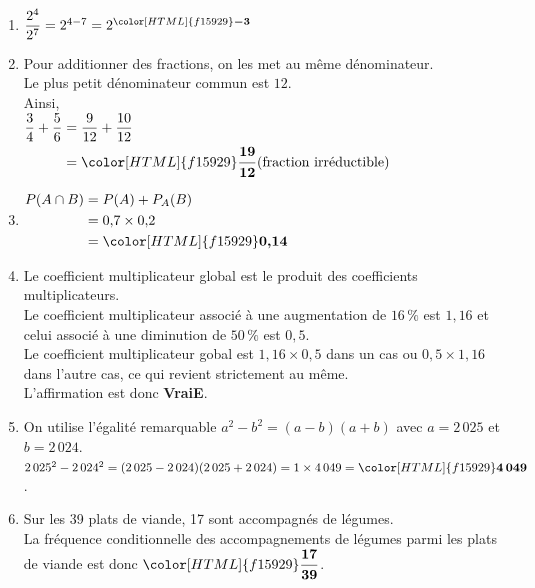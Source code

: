 \documentclass[a4paper,11pt,landscape,exos]{nsi} %
\begin{document}
\begin{multicols}{2}
\begin{enumerate}[]
\item $\dfrac{2^4}{2^7}=2^{4-7}=2^{\color[HTML]{f15929}\boldsymbol{-3}}$

\item Pour additionner des fractions, on les met au même dénominateur.\\
  Le plus petit dénominateur commun est $12$.\\
             Ainsi, \\
           $\begin{aligned}
           \dfrac{3}{4} + \dfrac{5}{6}&=
            \dfrac{9}{12}+\dfrac{10}{12} \\
           &={\color[HTML]{f15929}\boldsymbol{\dfrac{19}{12}}}\text{(fraction irréductible)}
           \end{aligned}$
             
             
            
\item $\begin{aligned}
          P(A\cap B)&=P(A)+P_A(B)\\
          &=0{,}7\times 0{,}2\\
&={\color[HTML]{f15929}\boldsymbol{0{,}14}}
          \end{aligned}$
      
\item Le coefficient multiplicateur global est le produit des coefficients multiplicateurs.\\
    Le coefficient multiplicateur associé à une augmentation de $16\,\%$ est $1{,}16$ et celui associé à une diminution de 
    $50\,\%$ est $0{,}5$.\\ 
    Le coefficient multiplicateur gobal est  $1{,}16\times 0{,}5$ dans un cas ou $0{,}5\times 1{,}16$ dans l'autre cas, ce qui revient strictement au même. 
    \\
  L'affirmation est donc  {\bfseries \color[HTML]{f15929}VraiE}.

 \item On utilise l'égalité remarquable $a^2-b^2=(a-b)(a+b)$ avec $a=2\,025$ et $b=2\,024$.\\
        $2\,025^2-2\,024^2=(2\,025-2\,024)(2\,025+2\,024)=1\times 4\,049={\color[HTML]{f15929}\boldsymbol{4\,049}}$.
             
\item Sur les 39 plats de viande, 17 sont accompagnés de légumes.\\
      La fréquence conditionnelle des accompagnements de légumes parmi les plats de viande est donc ${\color[HTML]{f15929}\boldsymbol{\dfrac{17}{39}}}$.


\end{enumerate}
\end{multicols}
\end{document}
